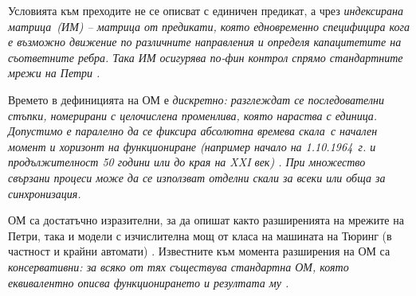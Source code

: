 Условията към преходите не се описват с единичен предикат, а чрез \it индексирана матрица\rm\ (ИМ) -- матрица от предикати, която едновременно специфицира кога е възможно движение по различните направления и определя капацитетите на съответните ребра. Така ИМ осигурява по-фин контрол спрямо стандартните мрежи на Петри \cite{Z1}.

Времето в дефиницията на ОМ е \it дискретно\rm: разглеждат се последователни стъпки, номерирани с целочислена променлива, която нараства с единица. Допустимо е паралелно да се фиксира \it абсолютна времева скала\rm\ с начален момент и хоризонт на функциониране (например начало на 1.10.1964~г. и продължителност 50 години или до края на XXI век) \cite{Z1}. При множество свързани процеси може да се използват отделни скали за всеки или обща за синхронизация.

ОМ са достатъчно изразителни, за да опишат както разширенията на мрежите на Петри, така и модели с изчислителна мощ от класа на машината на Тюринг (в частност и крайни автомати) \cite{Z1}. Известните към момента разширения на ОМ са \it консервативни\rm: за всяко от тях съществува стандартна ОМ, която еквивалентно описва функционирането и резултата му \cite{Z1,BAM}.

\vspace{0.2cm}

